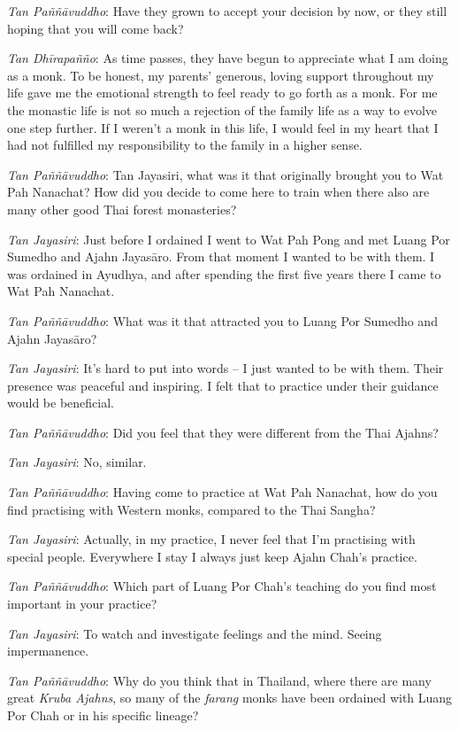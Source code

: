 \emph{Tan Paññāvuddho}: Have they grown to accept your decision by now, 
or they still hoping that you will come back? 

\emph{Tan Dhīrapañño}: As time passes, they have begun to appreciate
what I am doing as a monk. To be honest, my parents' generous, loving
support throughout my life gave me the emotional strength to feel ready
to go forth as a monk. For me the monastic life is not so much a
rejection of the family life as a way to evolve one step further. If I
weren't a monk in this life, I would feel in my heart that I had not
fulfilled my responsibility to the family in a higher sense. 

\emph{Tan Paññāvuddho}: Tan Jayasiri, what was it that originally
brought you to Wat Pah Nanachat? How did you decide to come here to
train when there also are many other good Thai forest monasteries? 

\emph{Tan Jayasiri}: Just before I ordained I went to Wat Pah Pong and
met Luang Por Sumedho and Ajahn Jayasāro. From that moment I wanted to
be with them. I was ordained in Ayudhya, and after spending the first
five years there I came to Wat Pah Nanachat. 

\emph{Tan Paññāvuddho}: What was it that attracted you to Luang Por
Sumedho and Ajahn Jayasāro? 

\emph{Tan Jayasiri}: It's hard to put into words -- I just wanted to be
with them. Their presence was peaceful and inspiring. I felt that to
practice under their guidance would be beneficial. 

\emph{Tan Paññāvuddho}: Did you feel that they were different from the
Thai Ajahns? 

\emph{Tan Jayasiri}: No, similar. 

\emph{Tan Paññāvuddho}: Having come to practice at Wat Pah Nanachat, 
how do you find practising with Western monks, compared to the Thai
Sangha? 

\emph{Tan Jayasiri}: Actually, in my practice, I never feel that I'm
practising with special people. Everywhere I stay I always just keep
Ajahn Chah's practice. 

\emph{Tan Paññāvuddho}: Which part of Luang Por Chah's teaching do you
find most important in your practice? 

\emph{Tan Jayasiri}: To watch and investigate feelings and the mind. 
Seeing impermanence. 

\emph{Tan Paññāvuddho}: Why do you think that in Thailand, where there
are many great \emph{Kruba Ajahns}, so many of the \emph{farang} monks
have been ordained with Luang Por Chah or in his specific lineage? 

